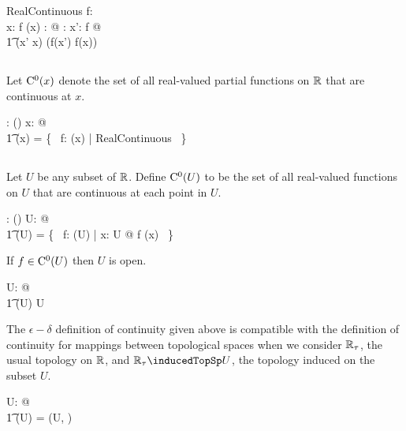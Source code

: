 \documentclass{amsart}
\begin{document}
\begin{schema}{RealContinuous}
	f: \R \pfun \R \\
	x: \R
\where
	f \in \FunR(x)
\also
	\forall \epsilon: \Rpos @ \exists \delta: \Rpos@ \forall x': \dom f @ \\
	\t1	\absR(x' \subR x) \ltR \delta \implies \absR(f(x') \subR f(x)) \ltR \epsilon
\end{schema}

\subsection{}

Let $\operatorname{C^0}(x)$ denote the set of all real-valued partial functions on $\mathbb{R}$ that are continuous at $x$.
\begin{axdef}
	\CzeroR: \R \fun \power(\R \pfun \R)
\where
	\forall x: \R @ \\
	\t1	\CzeroR(x) = \{~ f: \FunR(x) | RealContinuous ~\}
\end{axdef}

\subsection{}

Let $U$ be any subset of $\mathbb{R}$. 
Define $\operatorname{C^0}(U)$ to be the set of all real-valued functions on $U$ that are continuous at each point in $U$.

\begin{axdef}
	\CzeroPR: \power \R \fun \power (\R \pfun \R)
\where
	\forall U: \power \R @ \\
	\t1	\CzeroPR(U) = \{~ f: \FunPR(U) | \forall x: U @ f \in   \CzeroR(x) ~\}
\end{axdef}

\begin{remark}
If $f \in \operatorname{C^0}(U)$ then $U$ is open.

\begin{zed}
	\forall U: \power \R @ \\
	\t1	\CzeroPR(U) \neq \emptyset \implies U \in \openR
\end{zed}

\end{remark}

\begin{remark}
The $\epsilon-\delta$ definition of continuity given above is compatible with the definition
of continuity for mappings between topological spaces when we consider $\mathbb{R}_\tau$, the usual topology on $\mathbb{R}$,
and $\Rtau \inducedTopSp U$, the topology induced on the subset $U$.

\begin{zed}
	\forall U: \openR @ \\
	\t1	\CzeroPR(U) = \CzeroTT(\Rtau \inducedTopSp U, \Rtau)
\end{zed}

\end{remark}
\end{document}
